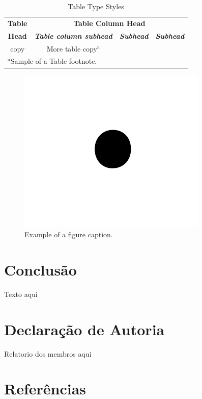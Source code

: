 \documentclass[relatorio]{IEEEtran}
\begin{document}
\begin{table}[htbp]
\caption{Table Type Styles}
\begin{center}
\begin{tabular}{|c|c|c|c|}
\hline
\textbf{Table}&\multicolumn{3}{|c|}{\textbf{Table Column Head}} \\
\cline{2-4} 
\textbf{Head} & \textbf{\textit{Table column subhead}}& \textbf{\textit{Subhead}}& \textbf{\textit{Subhead}} \\
\hline
copy& More table copy$^{\mathrm{a}}$& &  \\
\hline
\multicolumn{4}{l}{$^{\mathrm{a}}$Sample of a Table footnote.}
\end{tabular}
\label{tab1}
\end{center}
\end{table}

\begin{figure}[htbp]
\centerline{\includegraphics{fig1.png}}
\caption{Example of a figure caption.}
\label{fig}
\end{figure}


\section{Conclusão}
Texto aqui

\section{Declaração de Autoria}
Relatorio dos membros aqui

\section*{Referências}
\end{document}
